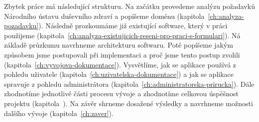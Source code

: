 Zbytek práce má následující strukturu.
Na začátku provedeme analýzu požadavků Národního ústavu duševního zdraví a popíšeme doménu (kapitola~\ref{ch:analyza-pozadavku}).
Následně prozkoumáme již existující software, který v práci použijeme (kapitola~\ref{ch:analyza-existujicich-reseni-pro-praci-s-formulari}).
Ná základě průzkumu navrhneme architekturu softwaru.
Poté popíšeme jakým způsobem jsme postupovali při implementaci a proč jsme tento postup zvolili (kapitola~\ref{ch:vyvojova-dokumentace}).
Vysvětlíme, jak se aplikace používá z pohledu uživatele (kapitola~\ref{ch:uzivatelska-dokumentace}) a jak se aplikace spravuje z pohledu administrátora (kapitola~\ref{ch:administratorska-prirucka}).
Dále zhodnotíme jednotlivé části procesu vývoje a zhodnotíme celkovou úspěšnost projektu (kapitola~).
Na závěr shrneme dosažené výsledky a navrhneme možnosti dalšího vývoje (kapitola~\ref{ch:zaver}).